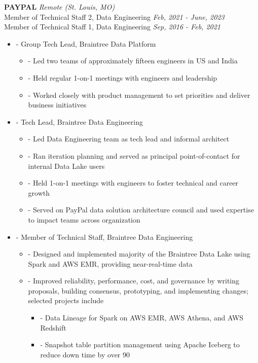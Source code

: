 \documentclass[a4paper,11pt]{article}
\newenvironment{pitemize}{
\begin{itemize}
\setlength{\itemsep}{.01in}
\setlength{\parskip}{.01in}
}
{\end{itemize}}
\begin{document}
\vspace{0.2in}
\textbf{PAYPAL} \hfill \textit{Remote (St. Louis, MO)} \\
Member of Technical Staff 2, Data Engineering \hfill \textit{Feb, 2021 - June, 2023} \\
Member of Technical Staff 1, Data Engineering \hfill \textit{Sep, 2016 - Feb, 2021}
\begin{pitemize}
    \item[-]Group Tech Lead, Braintree Data Platform
    \begin{pitemize}
        \item[-]Led two teams of approximately fifteen engineers in US and India
        \item[-]Held regular 1-on-1 meetings with engineers and leadership
        \item[-]Worked closely with product management to set priorities and deliver business initiatives
    \end{pitemize}
    \item[-]Tech Lead, Braintree Data Engineering
    \begin{pitemize}
        \item[-]Led Data Engineering team as tech lead and informal architect
        \item[-]Ran iteration planning and served as principal point-of-contact for internal Data Lake users
        \item[-]Held 1-on-1 meetings with engineers to foster technical and career growth
        \item[-]Served on PayPal data solution architecture council and used expertise to impact teams across organization
    \end{pitemize}
    \item[-]Member of Technical Staff, Braintree Data Engineering
    \begin{pitemize}
        \item[-]Designed and implemented majority of the Braintree Data Lake using Spark and AWS EMR, providing near-real-time data
        \item[-]Improved reliability, performance, cost, and governance by writing proposals, building consensus, prototyping, and implementing changes; selected projects include
        \begin{pitemize}
            \item[-]Data Lineage for Spark on AWS EMR, AWS Athena, and AWS Redshift
            \item[-]Snapshot table partition management using Apache Iceberg to reduce down time by over 90%

\end{pitemize}
\end{pitemize}
\end{pitemize}
\end{document}
